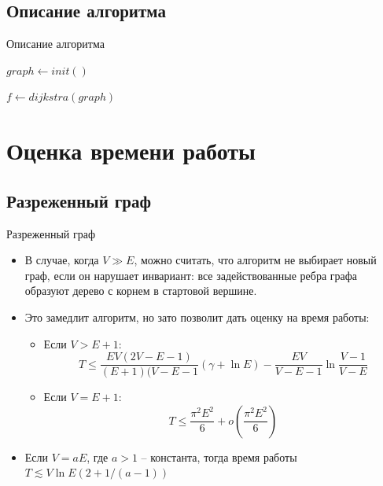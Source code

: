 \documentclass{beamer}
\begin{document}
 \subsection{Описание алгоритма}
 \begin{frame}{Описание алгоритма}
  \begin{algorithm}[H]
  
  $graph \gets init()$
  
  $f \gets dijkstra(graph)$
  
  \end{algorithm}
 \end{frame}
 
 \section{Оценка времени работы}
 \subsection{Разреженный граф}
 \begin{frame}{Разреженный граф}
  \begin{itemize}
   \item В случае, когда $V \gg E$, можно считать, что алгоритм не выбирает новый граф, если он нарушает инвариант: все задействованные ребра графа образуют дерево с корнем в стартовой вершине.
   \item Это замедлит алгоритм, но зато позволит дать оценку на время работы:
   \begin{itemize}
    \item Если $V > E + 1$:
    $$T \le \frac{EV(2V - E - 1)}{(E + 1)(V - E - 1}(\gamma + \ln E) - \frac{EV}{V - E - 1} \ln\frac{V - 1}{V - E}$$
    \item Если $V = E + 1$:
    $$T \le \frac{\pi^2 E^2}{6} + o\left( \frac{\pi^2 E^2}{6} \right)$$
   \end{itemize}
   \item Если $V = aE$, где $a > 1$ -- константа, тогда время работы $T \lesssim V \ln{E} \left(2 + 1/(a - 1)\right)$
  \end{itemize}
 \end{frame}
\end{document}
